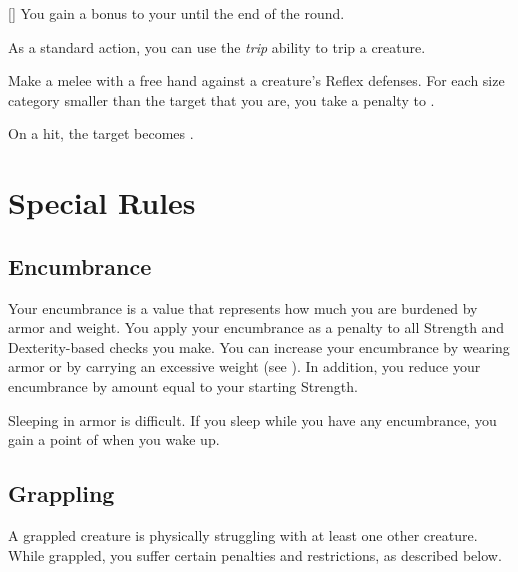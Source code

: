        \begin{freeability}{}[]
            You gain a  bonus to your  until the end of the round.
        \end{freeability}

         As a standard action, you can use the \textit{trip} ability to trip a creature.

        \begin{freeability}{}
            Make a melee  with a free hand against a creature's Reflex defenses.
            For each size category smaller than the target that you are, you take a  penalty to .

            On a hit, the target becomes \prone.
        \end{freeability}

\section{Special Rules}
    \subsection{Encumbrance}\label{Encumbrance}
        Your encumbrance is a value that represents how much you are burdened by armor and weight.
        You apply your encumbrance as a penalty to all Strength and Dexterity-based checks you make.
        You can increase your encumbrance by wearing armor or by carrying an excessive weight (see ).
        In addition, you reduce your encumbrance by amount equal to your starting Strength.

        Sleeping in armor is difficult.
        If you sleep while you have any encumbrance, you gain a point of  when you wake up.

    \subsection{Grappling}\label{Grappling}
        A grappled creature is physically struggling with at least one other creature.
        While grappled, you suffer certain penalties and restrictions, as described below.

